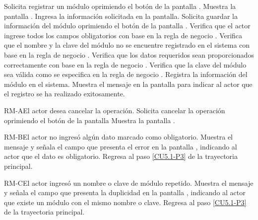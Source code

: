	\begin{UCtrayectoria}
		\UCpaso[\UCactor] Solicita registrar un módulo oprimiendo el botón  de la pantalla .
		\UCpaso[\UCsist] Muestra la pantalla .
		\UCpaso[\UCactor] Ingresa la información solicitada en la pantalla. \label{CU5.1-P3}
		\UCpaso[\UCactor] Solicita guardar la información del módulo oprimiendo el botón  de la pantalla . 
		\UCpaso[\UCsist] Verifica que el actor ingrese todos los campos obligatorios con base en la regla de negocio . 
		\UCpaso[\UCsist] Verifica que el nombre y la clave del módulo no se encuentre registrado en el sistema con base en la regla de negocio . 
		\UCpaso[\UCsist] Verifica que los datos requeridos sean proporcionados correctamente con base en la regla de negocio .  
		\UCpaso[\UCsist] Verifica que la clave del módulo sea válida como se especifica en la regla de negocio . 
		\UCpaso[\UCsist] Registra la información del módulo en el sistema.
		\UCpaso[\UCsist] Muestra el mensaje  en la pantalla  para indicar al actor que el registro se ha realizado exitosamente.
	\end{UCtrayectoria}		
	
	\begin{UCtrayectoriaA}{RM-A}{El actor desea cancelar la operación.}
		\UCpaso[\UCactor] Solicita cancelar la operación oprimiendo el botón  de la pantalla 
		\UCpaso[\UCsist] Muestra la pantalla .
	\end{UCtrayectoriaA}

	\begin{UCtrayectoriaA}{RM-B}{El actor no ingresó algún dato marcado como obligatorio.}
		\UCpaso[\UCsist] Muestra el mensaje  y señala el campo que presenta el error en la pantalla , indicando al actor que el dato es obligatorio.
		\UCpaso Regresa al paso \ref{CU5.1-P3} de la trayectoria principal.
	\end{UCtrayectoriaA}
	
	\begin{UCtrayectoriaA}{RM-C}{El actor ingresó un nombre o clave de módulo repetido.}
		\UCpaso[\UCsist] Muestra el mensaje  y señala el campo que presenta la duplicidad en la pantalla , indicando al actor que existe un módulo con el mismo nombre o clave.
		\UCpaso Regresa al paso \ref{CU5.1-P3} de la trayectoria principal.
	\end{UCtrayectoriaA}

